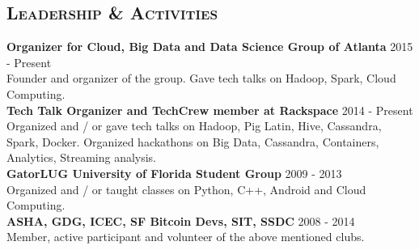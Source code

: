 \begin{resume}






\section{\textsc{Leadership \& Activities}}
\textbf{Organizer for Cloud, Big Data and Data Science Group of Atlanta} \hfill 2015 - Present\\
Founder and organizer of the group. Gave tech talks on Hadoop, Spark, Cloud Computing.\\
\textbf{Tech Talk Organizer and TechCrew member at Rackspace} \hfill 2014 - Present\\
Organized and / or gave tech talks on Hadoop, Pig Latin, Hive, Cassandra, Spark, Docker. Organized hackathons on Big Data, Cassandra, Containers, Analytics, Streaming analysis.\\
\textbf{GatorLUG University of Florida Student Group} \hfill 2009 - 2013\\
Organized and / or taught classes on Python, C++, Android and Cloud Computing.\\
\textbf{ASHA, GDG, ICEC, SF Bitcoin Devs, SIT, SSDC} \hfill 2008 - 2014\\
Member, active participant and volunteer of the above mentioned clubs.



\end{resume}
